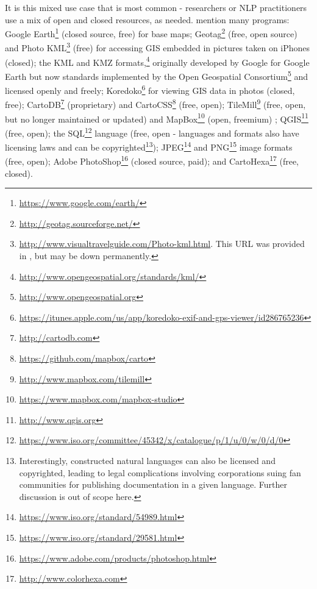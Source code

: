 It is this mixed use case that is most common - researchers or NLP practitioners use a mix of open and closed resources, as needed. \citet{gawne2016mapmaking} mention many programs: Google Earth\footnote{\href{https://www.google.com/earth/}{https://www.google.com/earth/}} (closed source, free) for base maps; Geotag\footnote{\href{http://geotag.sourceforge.net/}{http://geotag.sourceforge.net/}} (free, open source) and Photo KML\footnote{\href{http://www.visualtravelguide.com/Photo-kml.html}{http://www.visualtravelguide.com/Photo-kml.html}. This URL was provided in \citet{gawne2016mapmaking}, but may be down permanently.} (free) for accessing GIS embedded in pictures taken on iPhones (closed); the KML and KMZ formats,\footnote{\href{http://www.opengeospatial.org/standards/kml/}{http://www.opengeospatial.org/standards/kml/}} originally developed by Google for Google Earth but now standards implemented by the Open Geospatial Consortium\footnote{\href{http://www.opengeospatial.org}{http://www.opengeospatial.org}} and licensed openly and freely; Koredoko\footnote{\href{https://itunes.apple.com/us/app/koredoko-exif-and-gps-viewer/id286765236}{https://itunes.apple.com/us/app/koredoko-exif-and-gps-viewer/id286765236}} for viewing GIS data in photos (closed, free); CartoDB\footnote{\href{http://cartodb.com}{http://cartodb.com}} (proprietary) and CartoCSS\footnote{\href{https://github.com/mapbox/carto}{https://github.com/mapbox/carto}} (free, open); TileMill\footnote{\href{http://www.mapbox.com/tilemill}{http://www.mapbox.com/tilemill}} (free, open, but no longer maintained or updated) and MapBox\footnote{\href{https://www.mapbox.com/mapbox-studio/}{https://www.mapbox.com/mapbox-studio}} (open, freemium) ; QGIS\footnote{\href{http://www.qgis.org}{http://www.qgis.org}} (free, open); the SQL\footnote{\href{https://www.iso.org/committee/45342/x/catalogue/p/1/u/0/w/0/d/0}{https://www.iso.org/committee/45342/x/catalogue/p/1/u/0/w/0/d/0}} language (free, open - languages and formats also have licensing laws and can be copyrighted\footnote{Interestingly, constructed natural languages can also be licensed and copyrighted, leading to legal complications involving corporations suing fan communities for publishing documentation in a given language. Further discussion is out of scope here.}); JPEG\footnote{\href{https://www.iso.org/standard/54989.html}{https://www.iso.org/standard/54989.html}} and PNG\footnote{\href{https://www.iso.org/standard/29581.html}{https://www.iso.org/standard/29581.html}} image formats (free, open); Adobe PhotoShop\footnote{\href{https://www.adobe.com/products/photoshop.html}{https://www.adobe.com/products/photoshop.html}} (closed source, paid); and CartoHexa\footnote{\href{http://www.colorhexa.com}{http://www.colorhexa.com}} (free, closed).

